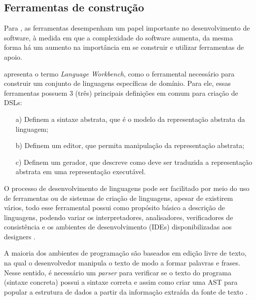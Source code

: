 \newpage
\subsection{Ferramentas de construção}
\label{ferramentasdsl}

Para , as ferramentas desempenham um papel importante no desenvolvimento de software, à medida em que a complexidade do software aumenta, da mesma forma há um aumento na importância em se construir e utilizar ferramentas de apoio.

 apresenta o termo \textit{Language Workbench}, como o ferramental necessário para construir um conjunto de linguagens específicas de domínio. Para ele, essas ferramentas possuem 3 (três) principais definições em comum para criação de \gls{DSL}s:

\begin{enumerate}
    \item[a)] Definem a sintaxe abstrata, que é o modelo da representação abstrata da linguagem;
    \item[b)] Definem um editor, que permita manipulação da representação abstrata;
    \item[c)] Definem um gerador, que descreve como deve ser traduzida a representação abstrata em uma representação executável.
\end{enumerate}

O processo de desenvolvimento de linguagens pode ser facilitado por meio do uso de ferramentas ou de sistemas de criação de linguagens, apesar de existirem vários, todo esse ferramental possui como propósito básico a descrição de linguagens, podendo variar os interpretadores, analisadores, verificadores de consistência e os ambientes de desenvolvimento (\gls{IDE}s) disponibilizadas aos designers \cite{mernik2005and}. 

\begin{citacao}


A maioria dos ambientes de programação são baseados em edição livre de texto, na qual o desenvolvedor manipula o texto de modo a formar palavras e frases. Nesse sentido, é necessário um \textit{parser} para verificar se o texto do programa (sintaxe concreta) possui a sintaxe correta e assim como criar uma \gls{AST} para popular a estrutura de dados a partir da informação extraída da fonte de texto  \cite[p.179,tradução nossa]{dslengineering}.

\end{citacao}


